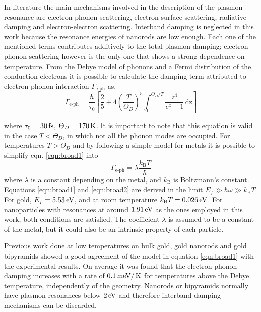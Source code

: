 In literature the main mechanisms involved in the description of the plasmon
resonance are electron-phonon scattering, electron-surface scattering, radiative
damping and electron-electron scattering\cite{Sonnichsen2002,Novo2006,Hu2008}.
Interband damping is neglected in this work because the resonance energies of
nanorods are low enough. Each one of the mentioned terms contributes additively
to the total plasmon damping; electron-phonon scattering however is the only one
that shows a strong dependence on temperature\cite{Liu2009b,Konrad2013}.
From the Debye model of phonons and a Fermi distribution of the conduction
electrons it is possible to calculate the damping term attributed to
electron-phonon interaction $\Gamma_{\textrm{e-ph}}$ as\cite{McKay1976},
\begin{equation}\label{eqn:broad1}
\Gamma_{\textrm{e-ph}} = 
\frac{\hbar}{\tau_0} \left[ \frac{2}{5}+4 \left( \frac{T}{\Theta_D} \right)^5
\int_0^{\Theta_D/T} \frac{z^4}{e^z - 1}\,\textrm{dz} \right]
\end{equation}

where $\tau_0 = 30\,\textrm{fs}$\cite{Liu2009b}, $\Theta_D = 170\,\textrm{K}$\cite{Link1999b}.  It
is important to note that this equation is valid in the case $T<\Theta_D$, in
which not all the phonon modes are occupied. For temperatures $T>\Theta_D$ and
by following a simple model for metals it is possible to simplify eqn.
\ref{eqn:broad1} into\cite{Kittel1996}
\begin{equation}\label{eqn:broad2}
\Gamma_{\textrm{e-ph}} = \lambda\frac{k_\textrm{B}T}{\hbar}
\end{equation}
where $\lambda$ is a constant depending on the metal, and $k_\textrm{B}$ is
Boltzmann's constant. Equations \ref{eqn:broad1} and \ref{eqn:broad2} are
derived in the limit $E_f \gg \hbar\omega \gg k_\textrm{B}T$. For gold, 
$E_f = 5.53\,\textrm{eV}$, and at room temperature $k_\textrm{B}T=0.026\,\textrm{eV}$. For
nanoparticles with resonances at around $1.91\,\textrm{eV}$ as the ones employed in this work, both
conditions are satisfied. The coefficient $\lambda$ is assumed to be a constant
of the metal, but it could also be an intrinsic property of each particle.

Previous work done at low temperatures on bulk gold\cite{McKay1976}, gold
nanorods\cite{Konrad2013} and gold bipyramids\cite{Liu2009b} showed a good
agreement of the model in equation \ref{eqn:broad1} with the experimental
results. On average it was found that the electron-phonon damping increases with
a rate of $0.1\,\textrm{meV}/\,\textrm{K}$ for temperatures above the Debye temperature,
independently of the geometry. Nanorods or bipyramids normally have plasmon
resonances below $2\,\textrm{eV}$ and therefore interband damping mechanisms can be
discarded.
\cite{Sundararaman2014,AlejandroManjavacasJunG.LiuVikramKulkarni2014}


